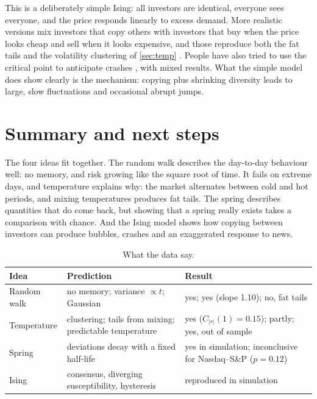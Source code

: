 \documentclass[11pt,a4paper]{article}
\begin{document}
This is a deliberately simple Ising: all investors are identical, everyone sees everyone, and the price
responds linearly to excess demand. More realistic versions mix investors that copy others with
investors that buy when the price looks cheap and sell when it looks expensive, and those reproduce both
the fat tails and the volatility clustering of \cref{sec:temp} \cite{bornholdt2001}. People have also tried
to use the critical point to anticipate crashes \cite{sornette2003}, with mixed results. What the simple
model does show clearly is the mechanism: copying plus shrinking diversity leads to large, slow
fluctuations and occasional abrupt jumps.

\section{Summary and next steps}

The four ideas fit together. The random walk describes the day-to-day behaviour well: no memory, and risk
growing like the square root of time. It fails on extreme days, and temperature explains why: the market
alternates between cold and hot periods, and mixing temperatures produces fat tails. The spring describes
quantities that do come back, but showing that a spring really exists takes a comparison with chance. And
the Ising model shows how copying between investors can produce bubbles, crashes and an exaggerated
response to news.

\begin{table}[ht]
\centering\small
\caption{What the data say.}
\label{tab:summary}
\begin{tabular}{@{}p{3.0cm}p{5.2cm}p{5.4cm}@{}}
\toprule
Idea & Prediction & Result\\
\midrule
Random walk & no memory; variance $\propto t$; Gaussian & yes; yes (slope 1.10); no, fat tails\\
Temperature & clustering; tails from mixing; predictable temperature & yes ($C_{|r|}(1)=0.15$); partly; yes, out of sample\\
Spring & deviations decay with a fixed half-life & yes in simulation; inconclusive for Nasdaq--S\&P ($p=0.12$)\\
Ising & consensus, diverging susceptibility, hysteresis & reproduced in simulation\\
\bottomrule
\end{tabular}
\end{table}
\end{document}

